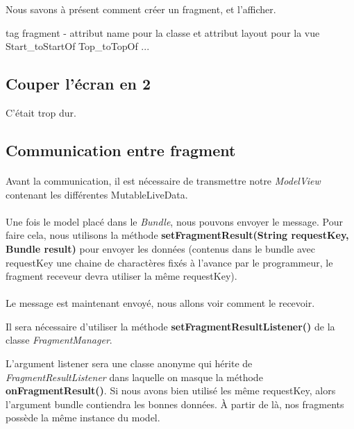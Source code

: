\documentclass[a4paper]{article}
\begin{document}
\begin{multicols}{2}
                    Nous savons à présent comment créer un fragment, et l'afficher.
                    
                    tag fragment - attribut name pour la classe et attribut layout pour la vue
                    \\
                    Start\_toStartOf
                    Top\_toTopOf 
                    ...
            
            \subsection{Couper l'écran en 2}
                C'était trop dur.
            \subsection{Communication entre fragment}
                \paragraph{}
                    Avant la communication, il est nécessaire de transmettre notre \emph{ModelView} contenant les différentes MutableLiveData.
                \paragraph{}
                    Une fois le model placé dans le \emph{Bundle}, nous pouvons envoyer le message. Pour faire cela, nous utilisons la méthode \textbf{setFragmentResult(String requestKey, Bundle result)} pour envoyer les données (contenus dans le bundle avec requestKey une chaine de charactères fixés à l'avance par le programmeur, le fragment receveur devra utiliser la même requestKey).
                
                \paragraph{}
                    Le message est maintenant envoyé, nous allons voir comment le recevoir.

                    Il sera nécessaire d'utiliser la méthode \textbf{setFragmentResultListener()} de la classe \emph{FragmentManager}.

                    L'argument listener sera une classe anonyme qui hérite de \emph{FragmentResultListener} dans laquelle on masque la méthode \textbf{onFragmentResult()}. Si nous avons bien utilisé les même requestKey, alors l'argument bundle contiendra les bonnes données. À partir de là, nos fragments possède la même instance du model.

\end{multicols}
\end{document}
